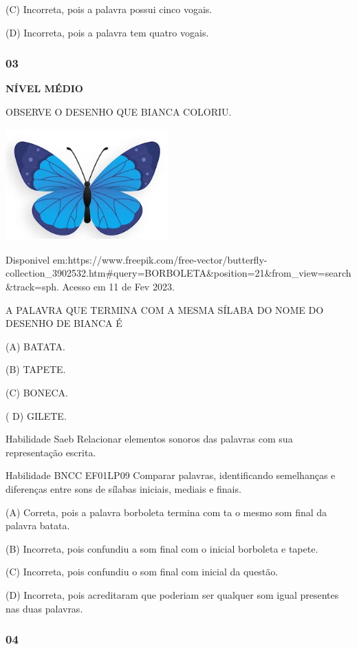 (C) Incorreta, pois a palavra possui cinco vogais.

(D) Incorreta, pois a palavra tem quatro vogais.

\subsubsection{03}\label{section-59}

\textbf{NÍVEL MÉDIO}

OBSERVE O DESENHO QUE BIANCA COLORIU.

\includegraphics[width=2.45833in,height=1.69432in]{media/image227.png}

Disponivel
em:https://www.freepik.com/free-vector/butterfly-collection\_3902532.htm\#query=BORBOLETA\&position=21\&from\_view=search\&track=sph.
Acesso em 11 de Fev 2023.

A PALAVRA QUE TERMINA COM A MESMA SÍLABA DO NOME DO DESENHO DE BIANCA É

(A) BATATA.

(B) TAPETE.

(C) BONECA.

( D) GILETE.

Habilidade Saeb Relacionar elementos sonoros das palavras com sua
representação escrita.

Habilidade BNCC EF01LP09 Comparar palavras, identificando semelhanças e
diferenças entre sons de sílabas iniciais, mediais e finais.

(A) Correta, pois a palavra borboleta termina com ta o mesmo som final
da palavra batata.

(B) Incorreta, pois confundiu a som final com o inicial borboleta e
tapete.

(C) Incorreta, pois confundiu o som final com inicial da questão.

(D) Incorreta, pois acreditaram que poderiam ser qualquer som igual
presentes nas duas palavras.

\subsubsection{04}\label{section-60}

